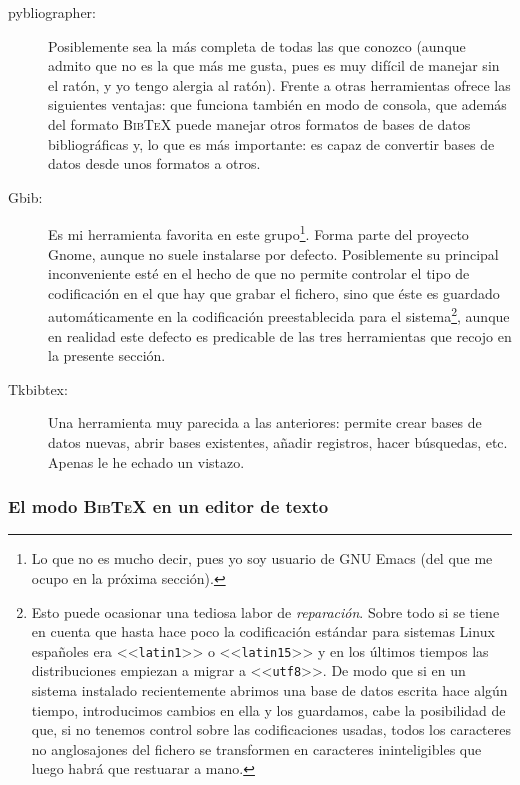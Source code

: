 \documentclass[a4paper,11pt]{article}
\def\btx-{\textsc{Bib\TeX}}
\def\ltr#1-{<<\texttt{#1}>>}
\begin{document}
\begin{description}

\item[pybliographer:]  Posiblemente  sea la  más  completa  de  todas las  que
  conozco (aunque admito que no es la que más me gusta, pues es muy difícil de
  manejar  sin  el  ratón, y  yo  tengo  alergia  al  ratón). Frente  a  otras
  herramientas ofrece las siguientes ventajas: que funciona también en modo de
  consola, que además del formato  \btx- puede manejar otros formatos de bases
  de datos bibliográficas  y, lo que es más importante:  es capaz de convertir
  bases de datos desde unos formatos a otros.

\item[Gbib:] Es  mi herramienta favorita  en este grupo\footnote{Lo que  no es
    mucho decir,  pues yo soy  usuario de  GNU Emacs (del  que me ocupo  en la
    próxima  sección).}.  Forma  parte  del proyecto  Gnome,  aunque no  suele
  instalarse por defecto.  Posiblemente  su principal inconveniente esté en el
  hecho de que no permite controlar el  tipo de codificación en el que hay que
  grabar  el  fichero,  sino  que  éste  es  guardado  automáticamente  en  la
  codificación  preestablecida para  el sistema\footnote{Esto  puede ocasionar
    una tediosa labor  de \emph{reparación}. Sobre todo si  se tiene en cuenta
    que hasta hace poco la codificación estándar para sistemas Linux españoles
    era  \ltr  latin1-   o  \ltr  latin15-  y  en   los  últimos  tiempos  las
    distribuciones  empiezan a  migrar a  \ltr utf8-.   De modo  que si  en un
    sistema  instalado recientemente abrimos  una base  de datos  escrita hace
    algún  tiempo, introducimos  cambios  en  ella y  los  guardamos, cabe  la
    posibilidad de que, si no tenemos control sobre las codificaciones usadas,
    todos  los  caracteres  no  anglosajones  del fichero  se  transformen  en
    caracteres ininteligibles que luego habrá que restuarar a mano.  }, aunque
  en realidad este  defecto es predicable de las  tres herramientas que recojo
  en la presente sección.

\item[Tkbibtex:] Una herramienta muy  parecida a las anteriores: permite crear
  bases  de datos  nuevas,  abrir bases  existentes,  añadir registros,  hacer
  búsquedas, etc. Apenas le he echado un vistazo.

\end{description}

\subsubsection{El modo \btx- en un editor de texto}
\label{sec:el-modo-bibtex}
\end{document}
